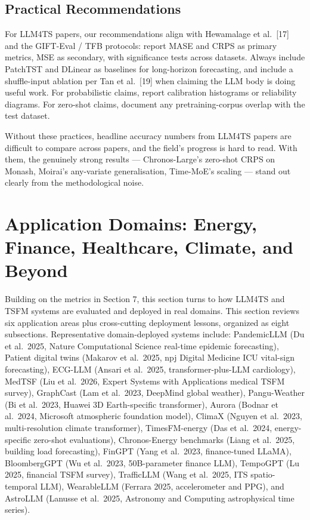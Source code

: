 \documentclass{article}
\begin{document}
\subsection{Practical Recommendations}\label{practical-recommendations}

For LLM4TS papers, our recommendations align with Hewamalage et al.~{[}17{]} and the GIFT-Eval / TFB protocols: report MASE and CRPS as primary metrics, MSE as secondary, with significance tests across datasets. Always include PatchTST and DLinear as baselines for long-horizon forecasting, and include a shuffle-input ablation per Tan et al.~{[}19{]} when claiming the LLM body is doing useful work. For probabilistic claims, report calibration histograms or reliability diagrams. For zero-shot claims, document any pretraining-corpus overlap with the test dataset.

Without these practices, headline accuracy numbers from LLM4TS papers are difficult to compare across papers, and the field's progress is hard to read. With them, the genuinely strong results --- Chronos-Large's zero-shot CRPS on Monash, Moirai's any-variate generalisation, Time-MoE's scaling --- stand out clearly from the methodological noise.

\section{Application Domains: Energy, Finance, Healthcare, Climate, and Beyond}\label{application-domains-energy-finance-healthcare-climate-and-beyond}

Building on the metrics in Section 7, this section turns to how LLM4TS and TSFM systems are evaluated and deployed in real domains. This section reviews six application areas plus cross-cutting deployment lessons, organized as eight subsections. Representative domain-deployed systems include: PandemicLLM (Du et al.~2025, Nature Computational Science real-time epidemic forecasting), Patient digital twins (Makarov et al.~2025, npj Digital Medicine ICU vital-sign forecasting), ECG-LLM (Ansari et al.~2025, transformer-plus-LLM cardiology), MedTSF (Liu et al.~2026, Expert Systems with Applications medical TSFM survey), GraphCast (Lam et al.~2023, DeepMind global weather), Pangu-Weather (Bi et al.~2023, Huawei 3D Earth-specific transformer), Aurora (Bodnar et al.~2024, Microsoft atmospheric foundation model), ClimaX (Nguyen et al.~2023, multi-resolution climate transformer), TimesFM-energy (Das et al.~2024, energy-specific zero-shot evaluations), Chronos-Energy benchmarks (Liang et al.~2025, building load forecasting), FinGPT (Yang et al.~2023, finance-tuned LLaMA), BloombergGPT (Wu et al.~2023, 50B-parameter finance LLM), TempoGPT (Lu 2025, financial TSFM survey), TrafficLLM (Wang et al.~2025, ITS spatio-temporal LLM), WearableLLM (Ferrara 2025, accelerometer and PPG), and AstroLLM (Lanusse et al.~2025, Astronomy and Computing astrophysical time series).
\end{document}
